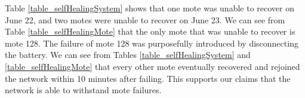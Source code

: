 Table \ref{table_selfHealingSystem} shows that one mote was unable to recover on June 22, and two motes were unable to recover on June 23. We can see from Table \ref{table_selfHealingMote} that the only mote that was unable to recover is mote 128. The failure of mote 128 was purposefully introduced by disconnecting the battery. We can see from Tables \ref{table_selfHealingSystem} and \ref{table_selfHealingMote} that every other mote eventually recovered and rejoined the network within 10 minutes after failing. This supports our claims that the network is able to withstand mote failures.





